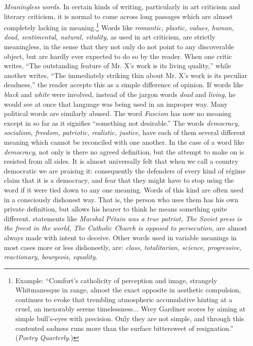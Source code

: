 \documentclass[a4paper]{article}
\begin{document}
\vspace{0.3cm}

\textit{Meaningless words.} In certain kinds of writing, particularly in art criticism and literary criticism, it is normal to come across long passages which are almost completely lacking in meaning.\footnote{Example: ``Comfort's catholicity of perception and image, strangely Whitmanesque in range, almost the exact opposite in aesthetic compulsion, continues to evoke that trembling atmospheric accumulative hinting at a cruel, an inexorably serene timelessness... Wrey Gardiner scores by aiming at simple bull's-eyes with precision. Only they are not simple, and through this contented sadness runs more than the surface bittersweet of resignation.'' (\textit{Poetry Quarterly.})} Words like \textit{romantic, plastic, values, human, dead, sentimental, natural, vitality,} as used in art criticism, are strictly meaningless, in the sense that they not only do not point to any discoverable object, but are hardly ever expected to do so by the reader. When one critic writes, ``The outstanding feature of Mr. X's work is its living quality,'' while another writes, ``The immediately striking thin about Mr. X's work is its peculiar deadness,'' the reader accepts this as a simple difference of opinion. If words like \textit{black} and \textit{white} were involved, instead of the jargon words \textit{dead} and \textit{living}, he would see at once that language was being used in an improper way. Many political words are similarly abused. The word \textit{Fascism} has now no meaning except in so far as it signifies ``something not desirable.'' The words \textit{democracy, socialism, freedom, patriotic, realistic, justice,} have each of them several different meaning which cannot be reconciled with one another. In the case of a word like \textit{democracy}, not only is there no agreed definition, but the attempt to make on is resisted from all sides. It is almost universally felt that when we call a country democratic we are praising it: consequently the defenders of every kind of régime claim that it is a democracy, and fear that they might have to stop using the word if it were tied down to any one meaning. Words of this kind are often used in a consciously dishonest way. That is, the person who uses them has his own private definition, but allows his hearer to think he means something quite different. statements like \textit{Marshal Pétain was a true patriot, The Soviet press is the freest in the world, The Catholic Church is opposed to persecution,} are almost always made with intent to deceive. Other words used in variable meanings in most cases more or less dishonestly, are: \textit{class, totalitarian, science, progressive, reactionary, bourgeois, equality}.
\end{document}
